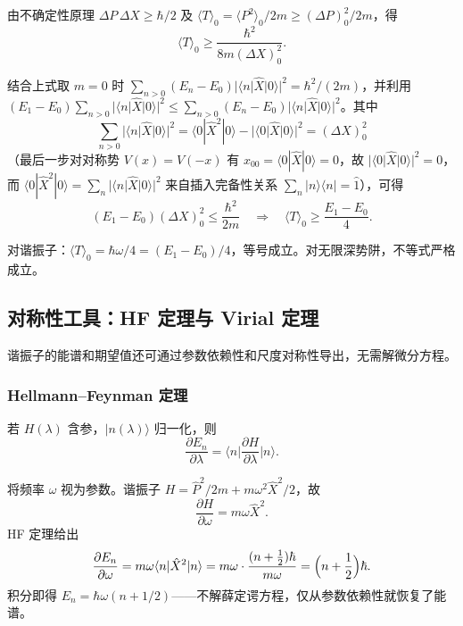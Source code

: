 \begin{formulabox}[基态动能的下界]
由不确定性原理 $\Delta P\,\Delta X\geq\hbar/2$ 及 $\langle T\rangle_0=\langle P^2\rangle_0/2m\geq(\Delta P)_0^2/2m$，得
\[
\langle T\rangle_0 \geq \frac{\hbar^2}{8m(\Delta X)_0^2}.
\]

结合上式取 $m=0$ 时 $\sum_{n>0}(E_n-E_0)|\langle n|\hat{X}|0\rangle|^2=\hbar^2/(2m)$，并利用 $(E_1-E_0)\sum_{n>0}|\langle n|\hat{X}|0\rangle|^2\leq\sum_{n>0}(E_n-E_0)|\langle n|\hat{X}|0\rangle|^2$。其中
\[
\sum_{n>0}|\langle n|\hat{X}|0\rangle|^2
= \langle 0|\hat{X}^2|0\rangle - |\langle 0|\hat{X}|0\rangle|^2
= (\Delta X)_0^2
\]
（最后一步对对称势 $V(x)=V(-x)$ 有 $x_{00}=\langle 0|\hat{X}|0\rangle=0$，故 $|\langle 0|\hat{X}|0\rangle|^2=0$，而 $\langle 0|\hat{X}^2|0\rangle=\sum_n|\langle n|\hat{X}|0\rangle|^2$ 来自插入完备性关系 $\sum_n|n\rangle\langle n|=\hat{1}$），可得
\[
(E_1-E_0)(\Delta X)_0^2 \leq \frac{\hbar^2}{2m}
\quad\Longrightarrow\quad
\langle T\rangle_0 \geq \frac{E_1-E_0}{4}.
\]

对谐振子：$\langle T\rangle_0=\hbar\omega/4=(E_1-E_0)/4$，等号成立。对无限深势阱，不等式严格成立。
\end{formulabox}

\subsection{对称性工具：HF 定理与 Virial 定理}

谐振子的能谱和期望值还可通过参数依赖性和尺度对称性导出，无需解微分方程。

\subsubsection{Hellmann--Feynman 定理}

若 $H(\lambda)$ 含参，$|n(\lambda)\rangle$ 归一化，则
\begin{equation}
\boxed{\frac{\partial E_n}{\partial\lambda}
= \Big\langle n\Big|\frac{\partial H}{\partial\lambda}\Big|n\Big\rangle.}
\end{equation}

将频率 $\omega$ 视为参数。谐振子 $H = \hat{P}^2/2m + m\omega^2\hat{X}^2/2$，故
\[
\frac{\partial H}{\partial\omega} = m\omega\hat{X}^2.
\]
HF 定理给出
\[
\frac{\partial E_n}{\partial\omega}
= m\omega\langle n|\hat{X}^2|n\rangle
= m\omega\cdot\frac{(n+\tfrac12)\hbar}{m\omega}
= \Bigl(n+\frac12\Bigr)\hbar.
\]
积分即得 $E_n = \hbar\omega(n+1/2)$——不解薛定谔方程，仅从参数依赖性就恢复了能谱。

